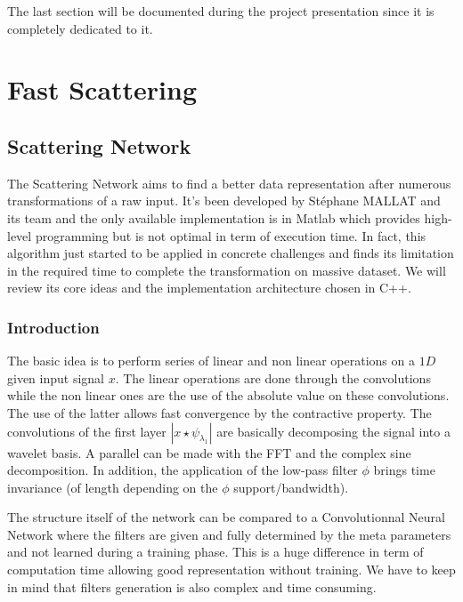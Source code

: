 \documentclass[a4paper]{report}
\begin{document}
The last section will be documented during the project presentation since it is completely dedicated to it.


\part{Fast Scattering}
\chapter{Scattering Network}


The Scattering Network aims to find a better data representation after numerous transformations of a raw input. It's been developed by St\'ephane MALLAT and its team and the only available implementation is in Matlab which provides high-level programming but is not optimal in term of execution time. 
In fact, this algorithm just started to be applied in concrete challenges and finds its limitation in the required time to complete the transformation on massive dataset. We will review its core ideas and the implementation architecture chosen in C++.

\section{Introduction}\label{conv}


The basic idea is to perform series of linear and non linear operations on a $1D$ given input signal $x$. The linear operations are done through the convolutions while the non linear ones are the use of the absolute value on these convolutions. The use of the latter allows fast convergence by the contractive property. The convolutions of the first layer $|x \star \psi_{\lambda_1}|$ are basically decomposing the signal into a wavelet basis. A parallel can be made with the FFT and the complex sine decomposition. In addition, the application of the low-pass filter $\phi$ brings time invariance (of length depending on the $\phi$ support/bandwidth).


The structure itself of the network can be compared to a Convolutionnal Neural Network where the filters are given and fully determined by the meta parameters and not learned during a training phase. This is a huge difference in term of computation time allowing good representation without training. We have to keep in mind that filters generation is also complex and time consuming.
\end{document}
